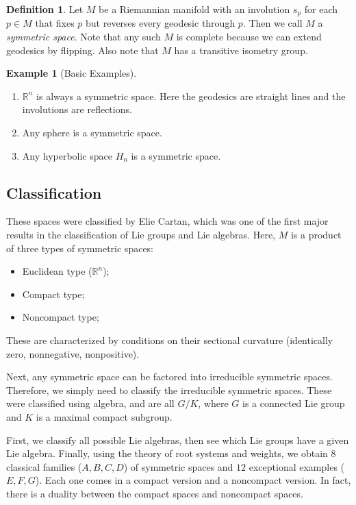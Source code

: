 \documentclass[leqno, openany]{memoir}
\theoremstyle{definition}
\newtheorem{defn}[thm]{Definition}
\newtheorem{exm}[thm]{Example}
\theoremstyle{remark}
\theoremstyle{plain}
\theoremstyle{definition}
\theoremstyle{remark}
\newcommand{\R}{\mathbb{R}}
\begin{document}
\begin{defn} Let $M$ be a Riemannian manifold with an involution $s_p$ for each
    $p \in M$ that fixes $p$ but reverses every geodesic through $p$. Then we
    call $M$ a \textit{symmetric space}. Note that any such $M$ is complete
    because we can extend geodesics by flipping. Also note that $M$ has a
    transitive isometry group.  \end{defn}

\begin{exm}[Basic Examples] \begin{enumerate} \item $\R^n$ is always a
    symmetric space. Here the geodesics are straight lines and the involutions
    are reflections.  \item Any sphere is a symmetric space.  \item Any
    hyperbolic space $H_n$ is a symmetric space.  \end{enumerate} \end{exm}

\subsection{Classification}%

These spaces were classified by Elie Cartan, which was one of the first major
results in the classification of Lie groups and Lie algebras. Here, $M$ is a
product of three types of symmetric spaces: \begin{itemize} \item Euclidean
    type ($\R^n$); \item Compact type; \item Noncompact type; \end{itemize}
    These are characterized by conditions on their sectional curvature
    (identically zero, nonnegative, nonpositive).

Next, any symmetric space can be factored into irreducible symmetric spaces.
Therefore, we simply need to classify the irreducible symmetric spaces. These
were classified using algebra, and are all $G/K$, where $G$ is a connected Lie
group and $K$ is a maximal compact subgroup.

First, we classify all possible Lie algebras, then see which Lie groups have a
given Lie algebra. Finally, using the theory of root systems and weights, we
obtain $8$ classical families ($A,B,C,D$) of symmetric spaces and $12$
exceptional examples ($E,F,G$). Each one comes in a compact version and a
noncompact version. In fact, there is a duality between the compact spaces and
noncompact spaces.
\end{document}
